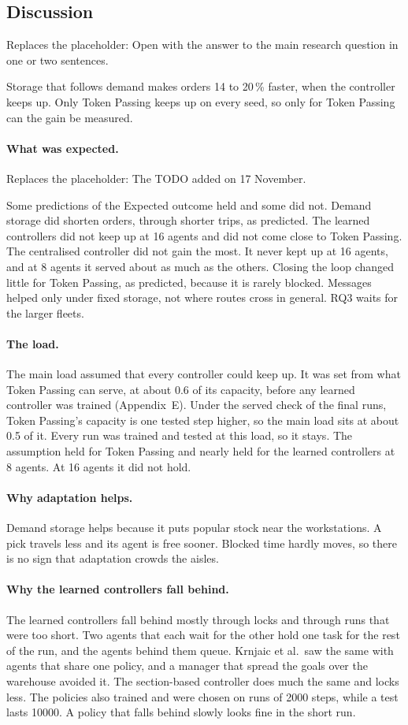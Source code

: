 \documentclass[11pt,a4paper]{article}
\newcommand{\placeholder}[1]{\textcolor{plc}{\small Replaces the placeholder: #1}\par}
\begin{document}
\subsection*{Discussion}

\placeholder{Open with the answer to the main research question in one or two sentences.}
Storage that follows demand makes orders 14 to 20\,\% faster, when the controller keeps up. Only
Token Passing keeps up on every seed, so only for Token Passing can the gain be measured.

\paragraph{What was expected.}
\placeholder{The TODO added on 17 November.}
Some predictions of the Expected outcome held and some did not. Demand storage did shorten orders,
through shorter trips, as predicted. The learned controllers did not keep up at 16 agents and did
not come close to Token Passing. The centralised controller did not gain the most. It never kept up
at 16 agents, and at 8 agents it served about as much as the others. Closing the loop changed little for
Token Passing, as predicted, because it is rarely blocked. Messages helped only under fixed
storage, not where routes cross in general. RQ3 waits for the larger fleets.

\paragraph{The load.}
The main load assumed that every controller could keep up. It was set from what Token Passing can
serve, at about 0.6 of its capacity, before any learned controller was trained
(Appendix~E). Under the served check of the final runs, Token Passing's capacity is
one tested step higher, so the main load sits at about 0.5 of it. Every run was trained and tested
at this load, so it stays. The assumption held for Token Passing and nearly held for the learned
controllers at 8 agents. At 16 agents it did not hold.

\paragraph{Why adaptation helps.}
Demand storage helps because it puts popular stock near the workstations. A pick travels less and
its agent is free sooner. Blocked time hardly moves, so there is no sign that adaptation crowds the
aisles.

\paragraph{Why the learned controllers fall behind.}
The learned controllers fall behind mostly through locks and through runs that were too short.
Two agents that each wait for the other hold one task for the rest of the run, and the agents behind
them queue. Krnjaic et al.\ saw the same with agents that share one policy, and a manager that spread
the goals over the warehouse avoided it. The section-based controller does much the same and locks
less. The policies also trained and were chosen on runs of 2000 steps, while a test lasts 10000. A
policy that falls behind slowly looks fine in the short run.
\end{document}

